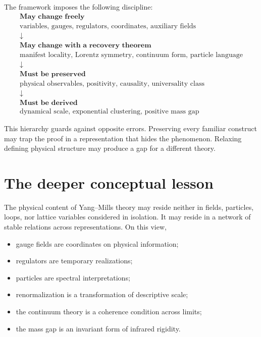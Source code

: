\documentclass[11pt]{article}
\begin{document}
The framework imposes the following discipline:
\begin{equation}
\boxed{
\begin{array}{c}
\textbf{May change freely}\\[1mm]
\text{variables, gauges, regulators, coordinates, auxiliary fields}\\[3mm]
\downarrow\\[-1mm]
\textbf{May change with a recovery theorem}\\[1mm]
\text{manifest locality, Lorentz symmetry, continuum form, particle language}\\[3mm]
\downarrow\\[-1mm]
\textbf{Must be preserved}\\[1mm]
\text{physical observables, positivity, causality, universality class}\\[3mm]
\downarrow\\[-1mm]
\textbf{Must be derived}\\[1mm]
\text{dynamical scale, exponential clustering, positive mass gap}
\end{array}}
\label{eq:hierarchy}
\end{equation}

This hierarchy guards against opposite errors.  Preserving every familiar
construct may trap the proof in a representation that hides the phenomenon.
Relaxing defining physical structure may produce a gap for a different theory.

\section{The deeper conceptual lesson}

The physical content of Yang--Mills theory may reside neither in fields,
particles, loops, nor lattice variables considered in isolation.  It may reside
in a network of stable relations across representations.  On this view,
\begin{itemize}[leftmargin=2em]
  \item gauge fields are coordinates on physical information;
  \item regulators are temporary realizations;
  \item particles are spectral interpretations;
  \item renormalization is a transformation of descriptive scale;
  \item the continuum theory is a coherence condition across limits;
  \item the mass gap is an invariant form of infrared rigidity.
\end{itemize}
\end{document}
